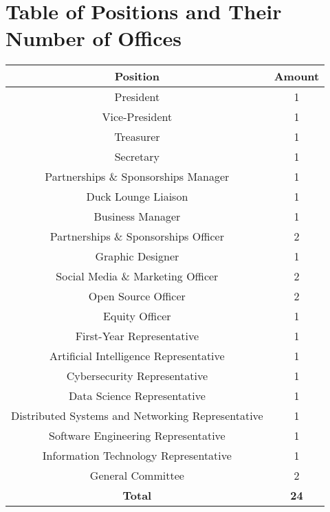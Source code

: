 \documentclass{schedule}
\begin{document}
\section{Table of Positions and Their Number of Offices}\label{appendix:tablePositions}
\begin{center}
    \vspace{1em}
    \def\arraystretch{1.1}
    \begin{tabular}{c|c}
        \textbf{Position}                                 & \textbf{Amount} \\
        \hline
        President                                         & 1               \\
        Vice-President                                    & 1               \\
        Treasurer                                         & 1               \\
        Secretary                                         & 1               \\
        Partnerships \& Sponsorships Manager              & 1               \\
        Duck Lounge Liaison                               & 1               \\
        Business Manager                                  & 1               \\
        Partnerships \& Sponsorships Officer              & 2               \\
        Graphic Designer                                  & 1               \\
        Social Media \& Marketing Officer                 & 2               \\
        Open Source Officer                               & 2               \\
        Equity Officer                                    & 1               \\
        First-Year Representative                         & 1               \\
        Artificial Intelligence Representative            & 1               \\
        Cybersecurity Representative                      & 1               \\
        Data Science Representative                       & 1               \\
        Distributed Systems and Networking Representative & 1               \\
        Software Engineering Representative               & 1               \\
        Information Technology Representative             & 1               \\
        General Committee                                 & 2               \\
        \hline
        \textbf{Total}                                    & \textbf{24}
    \end{tabular}
\end{center}

\newpage

\end{document}
